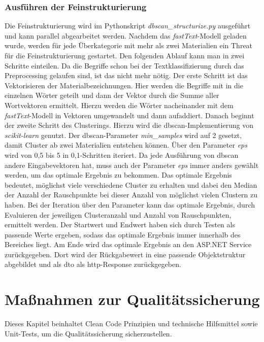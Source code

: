 \subsection{Ausführen der Feinstrukturierung}
\label{c:implementation:clustering}
Die Feinstrukturierung wird im Pythonskript \textit{dbscan\_structurize.py} ausgeführt und kann parallel abgearbeitet werden. Nachdem das \textit{fastText}-Modell geladen wurde, werden für jede Überkategorie mit mehr als zwei Materialien ein Threat für die Feinstrukturierung gestartet. Den folgenden Ablauf kann man in zwei Schritte einteilen. Da die Begriffe schon bei der Textklassifizierung durch das Preprocessing gelaufen sind, ist das nicht mehr nötig. Der erste Schritt ist das Vektorisieren der Materialbezeichnungen. Hier werden die Begriffe mit  in die einzelnen Wörter geteilt und dann der Vektor durch die Summe aller Wortvektoren ermittelt. Hierzu werden die Wörter nacheinander mit dem \textit{fastText}-Modell in Vektoren umgewandelt und dann aufaddiert. Danach beginnt der zweite Schritt des Clusterings. Hierzu wird die \ac{dbscan}-Implementierung von \textit{scikit-learn} \citep{scikit-learn} genutzt. Der \ac{dbscan}-Parameter \textit{min\_samples} wird auf 2 gesetzt, damit Cluster ab zwei Materialien entstehen können. Über den Parameter \textit{eps} wird von 0,5 bis 5 in 0,1-Schritten iteriert. Da jede Ausführung von \ac{dbscan} andere Eingabevektoren hat, muss auch der Parameter \textit{eps} immer anders gewählt werden, um das optimale Ergebnis zu bekommen. Das optimale Ergebnis bedeutet, möglichst viele verschiedene Cluster zu erhalten und dabei den Median der Anzahl der Rauschpunkte bei dieser Anzahl von möglichst vielen Clustern zu haben. Bei der Iteration über den Parameter kann das optimale Ergebnis, durch Evaluieren der jeweiligen Clusteranzahl und Anzahl von Rauschpunkten, ermittelt werden. Der Startwert und Endwert haben sich durch Testen als passende Werte ergeben, sodass das optimale Ergebnis immer innerhalb des Bereiches liegt. Am Ende wird das optimale Ergebnis an den ASP.NET Service zurückgegeben. Dort wird der Rückgabewert in eine passende Objektstruktur abgebildet und als \ac{dto} als \ac{http}-Response zurückgegeben.

\chapter{Maßnahmen zur Qualitätssicherung}
\label{c:qs}
Dieses Kapitel beinhaltet Clean Code Prinzipien und technische Hilfsmittel sowie Unit-Tests, um die Qualitätssicherung sicherzustellen.

